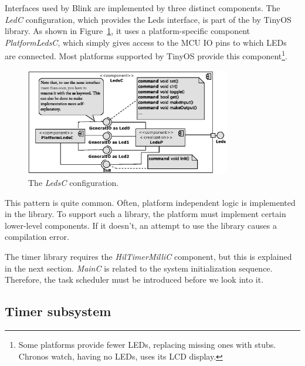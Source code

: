 Interfaces used by Blink are implemented by three distinct components.  The \emph{LedC} configuration, which provides the Leds interface, is part of the by TinyOS library.  As shown in Figure~\ref{fig:ledc}, it uses a platform-specific component \emph{PlatformLedsC}, which simply gives access to the MCU IO pins to which LEDs are connected. Most platforms supported by TinyOS provide this component\footnote{Some platforms provide fewer LEDs, replacing missing ones with stubs. Chronos watch, having no LEDs, uses its LCD display.}.
\begin{figure}[h]
  \centering
  \includegraphics[width=0.8\textwidth]{diagrams/ledsc.eps}
  \caption{The \emph{LedsC} configuration.}
  \label{fig:ledc}
\end{figure}

This pattern is quite common. Often, platform independent logic is implemented in the library. To support such a library, the platform must implement certain lower-level components.  If it doesn't, an attempt to use the library causes a compilation error.

The timer library requires the \emph{HilTimerMilliC} component, but this is explained in the next section. \emph{MainC} is related to the system initialization sequence. Therefore, the task scheduler must be introduced before we look into it.

\subsection{Timer subsystem}
\label{ch:timer_subsystem}

